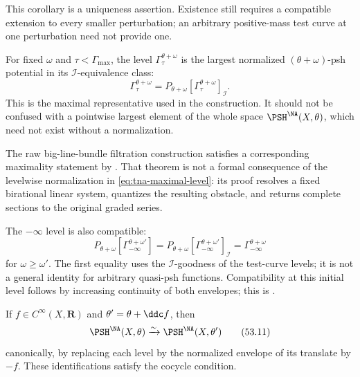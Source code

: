 This corollary is a uniqueness assertion.  Existence still requires a
compatible extension to every smaller perturbation; an arbitrary
positive-mass test curve at one perturbation need not provide one.

For fixed $\omega$ and $\tau<\Gamma_{\max}$, the level
$\Gamma_\tau^{\theta+\omega}$ is the largest normalized
$(\theta+\omega)$-psh potential in its $\mathcal I$-equivalence
class:
\[
 \Gamma_\tau^{\theta+\omega}
 =P_{\theta+\omega}
     [\Gamma_\tau^{\theta+\omega}]_{\mathcal I}.
\tag{53.9}\label{eq:tna-maximal-level}
\]
This is the maximal representative used in the construction.  It should
not be confused with a pointwise largest element of the whole space
$\PSH^{\NA}(X,\theta)$, which need not exist without a normalization.

The raw big-line-bundle filtration construction satisfies a corresponding
maximality statement by .  That theorem
is not a formal consequence of the levelwise normalization in
\eqref{eq:tna-maximal-level}: its proof resolves a fixed birational linear
system, quantizes the resulting obstacle, and returns complete sections to
the original graded series.

The $-\infty$ level is also compatible:
\[
 P_{\theta+\omega}
 [\Gamma_{-\infty}^{\theta+\omega'}]
 =
 P_{\theta+\omega}
 [\Gamma_{-\infty}^{\theta+\omega'}]_{\mathcal I}
 =
 \Gamma_{-\infty}^{\theta+\omega}
\tag{53.10}\label{eq:tna-minus-infinity-transition}
\]
for $\omega\geq\omega'$.  The first equality uses the
$\mathcal I$-goodness of the test-curve levels; it is not a general
identity for arbitrary quasi-psh functions.  Compatibility at this initial
level follows by increasing continuity of both envelopes; this is
\cite[Proposition~13.1.1]{XiaBook}.

\begin{proposition}\label{prop:tna-background-independence}
If $f\in C^\infty(X,\mathbf R)$ and $\theta'=\theta+\ddc f$, then
\[
                  \PSH^{\NA}(X,\theta)
                  \xrightarrow{\sim}
                  \PSH^{\NA}(X,\theta')
\tag{53.11}\label{eq:tna-background-independence}
\]
canonically, by replacing each level by the normalized envelope of its
translate by $-f$.  These identifications satisfy the cocycle
condition.
\end{proposition}

